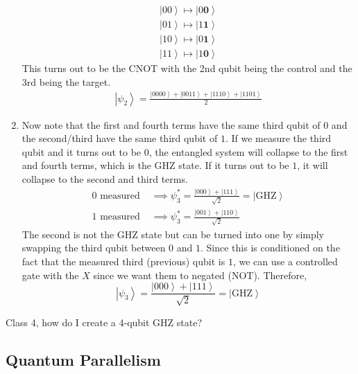 \documentclass{article}
\newcommand{\ket}[1]{\ensuremath{\left|#1\right\rangle}}
\begin{document}
\begin{theorem}
\begin{enumerate}
\begin{align}
            \ket{00} \mapsto \ket{0\mathbf{0}} \\ 
            \ket{01} \mapsto \ket{1\mathbf{1}} \\ 
            \ket{10} \mapsto \ket{0\mathbf{1}} \\ 
            \ket{11} \mapsto \ket{1\mathbf{0}} 
          \end{align}
          This turns out to be the CNOT with the 2nd qubit being the control and the 3rd being the target. 
          \begin{align} 
            \ket{\psi_2} = \frac{\ket{0000} + \ket{0011} + \ket{1110} + \ket{1101}}{2} 
          \end{align}
        \item Now note that the first and fourth terms have the same third qubit of $0$ and the second/third have the same third qubit of $1$. If we measure the third qubit and it turns out to be $0$, the entangled system will collapse to the first and fourth terms, which is the GHZ state. If it turns out to be $1$, it will collapse to the second and third terms. 
          \begin{align} 
            0 \text{ measured } & \implies \psi_3^\ast = \frac{\ket{000} + \ket{111}}{\sqrt{2}} = \ket{\mathrm{GHZ}} \\
            1 \text{ measured } & \implies \psi_3^\ast = \frac{\ket{001} + \ket{110}}{\sqrt{2}}
          \end{align}
        The second is not the GHZ state but can be turned into one by simply swapping the third qubit between $0$ and $1$. Since this is conditioned on the fact that the measured third (previous) qubit is $1$, we can use a controlled gate with the $X$ since we want them to negated (NOT). Therefore, 
        \begin{equation} 
          \ket{\psi_3} = \frac{\ket{000} + \ket{111}}{\sqrt{2}} = \ket{\mathrm{GHZ}} 
        \end{equation}
      \end{enumerate}
    \end{theorem}

    \begin{question}[To Do] 
      Class 4, how do I create a 4-qubit GHZ state? 
    \end{question}


  \subsection{Quantum Parallelism}
\end{document}
